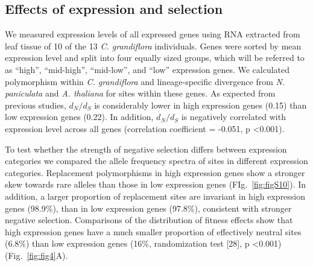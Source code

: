 \subsection{Effects of expression and selection}
We measured expression levels of all expressed genes using RNA extracted from leaf tissue of 10 of the 13 \textit{C. grandiflora} individuals. Genes were sorted by mean expression level and split into four equally sized groups, which will be referred to as “high”, “mid-high”, “mid-low”, and “low” expression genes. We calculated polymorphism within \textit{C. grandiflora} and lineage-specific divergence from \textit{N. paniculata} and \textit{A. thaliana} for sites within these genes. As expected from previous studies, $d_{N}/d_{S}$ is considerably lower in high expression genes (0.15) than low expression genes (0.22).  In addition, $d_{N}/d_{S}$ is negatively correlated with expression level across all genes (correlation coefficient = -0.051, p \textless 0.001).

To test whether the strength of negative selection differs between expression categories we compared the allele frequency spectra of sites in different expression categories. Replacement polymorphisms in high expression genes show a stronger skew towards rare alleles than those in low expression genes (FIg.~\ref{fig:figS10}). In addition, a larger proportion of replacement sites are invariant in high expression genes (98.9\%), than in low expression genes (97.8\%), consistent with stronger negative selection. Comparisons of the distribution of fitness effects show that high expression genes have a much smaller proportion of effectively neutral sites (6.8\%) than low expression genes (16\%, randomization test [28], p \textless  0.001) (Fig.~\ref{fig:fig4}A).  

